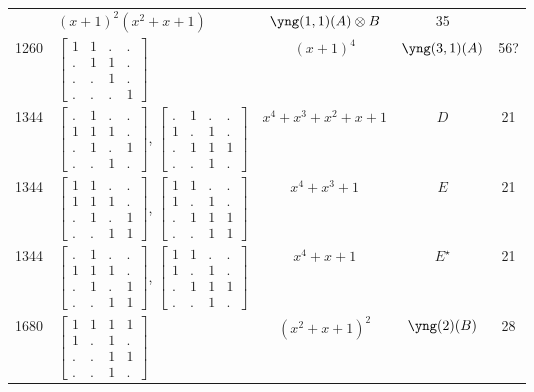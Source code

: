 \documentclass[11pt,oneside]{article}
\newcommand{\tensor}{\otimes}
\begin{document}
\begin{center}
\begin{tabular}{r|l|c|c|c}
  & $(x+1)^2(x^2+x+1)$  & $\yng(1,1)(A)\tensor B$ & 35  \\
1260  & $\begin{bmatrix}1&1&.&.\\.&1&1&.\\.&.&1&.\\.&.&.&1\end{bmatrix}$  & $(x+1)^4$  & $\yng(3,1)(A)$ & 56?  \\
1344  & 
$\begin{bmatrix}.&1&.&.\\1&1&1&.\\.&1&.&1\\.&.&1&.\end{bmatrix}$,
$\begin{bmatrix}.&1&.&.\\1&.&1&.\\.&1&1&1\\.&.&1&.\end{bmatrix}$
& $x^4+x^3+x^2+x+1$  & $D$ & 21  \\
1344  & 
$\begin{bmatrix}1&1&.&.\\1&1&1&.\\.&1&.&1\\.&.&1&1\end{bmatrix}$,
$\begin{bmatrix}1&1&.&.\\1&.&1&.\\.&1&1&1\\.&.&1&1\end{bmatrix}$
& $x^4+x^3+1$        & $E$ & 21  \\
1344  & 
$\begin{bmatrix}.&1&.&.\\1&1&1&.\\.&1&.&1\\.&.&1&1\end{bmatrix}$,
$\begin{bmatrix}1&1&.&.\\1&.&1&.\\.&1&1&1\\.&.&1&.\end{bmatrix}$
& $x^4+x+1$          & $E^\star$ & 21  \\
1680  & $\begin{bmatrix}1&1&1&1\\1&.&1&.\\.&.&1&1\\.&.&1&.\end{bmatrix}$  & $(x^2+x+1)^2$  & $\yng(2)(B)$ & 28  \\

\end{tabular}
\end{center}
\end{document}
